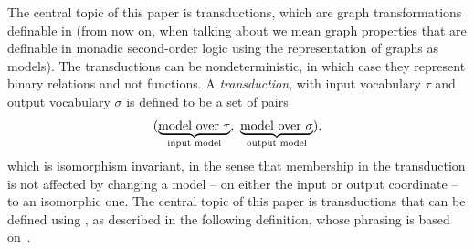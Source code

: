   The central topic of this paper is \mso transductions, which are graph transformations definable in \mso (from now on, when talking about \mso we mean graph properties that are definable in monadic second-order logic using the \msotwo representation of graphs as models). The transductions can be nondeterministic, in which case they represent binary relations and not functions.
A \emph{transduction}, with input vocabulary $\tau$ and output vocabulary $\sigma$ is defined to be a set of pairs 
\begin{align*}
    (\myunderbrace{\text{model over $\tau$}}{input model}, \ 
    \myunderbrace{\text{model over $\sigma$}}{output model}),
\end{align*}
which is isomorphism invariant, in the sense that membership in the transduction is not affected by changing a model -- on either the input or output coordinate -- to an isomorphic one. The central topic of this paper is transductions that can be defined using \mso, as described in the following definition, whose phrasing is based on~\cite[p.~9--10]{bojanczykOptimizingTreeDecompositions2017a}. 

